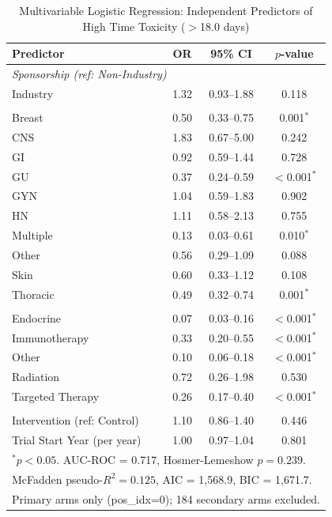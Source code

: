 \documentclass[11pt,a4paper]{article}
\begin{document}
\begin{table}[H]
\centering
\caption{Multivariable Logistic Regression: Independent Predictors of High Time Toxicity ($>$18.0 days)}
\label{tab:regression}
\begin{tabular}{lccc}
\toprule
\textbf{Predictor} & \textbf{OR} & \textbf{95\% CI} & \textbf{$p$-value} \\
\midrule
\multicolumn{4}{l}{\textit{Sponsorship (ref: Non-Industry)}} \\
\quad Industry & 1.32 & 0.93--1.88 & 0.118 \\
\addlinespace
\multicolumn{4}{l}{\textit{Disease Site (ref: Hematologic)}} \\
\quad Breast & 0.50 & 0.33--0.75 & 0.001$^*$ \\
\quad CNS & 1.83 & 0.67--5.00 & 0.242 \\
\quad GI & 0.92 & 0.59--1.44 & 0.728 \\
\quad GU & 0.37 & 0.24--0.59 & $<$0.001$^*$ \\
\quad GYN & 1.04 & 0.59--1.83 & 0.902 \\
\quad HN & 1.11 & 0.58--2.13 & 0.755 \\
\quad Multiple & 0.13 & 0.03--0.61 & 0.010$^*$ \\
\quad Other & 0.56 & 0.29--1.09 & 0.088 \\
\quad Skin & 0.60 & 0.33--1.12 & 0.108 \\
\quad Thoracic & 0.49 & 0.32--0.74 & 0.001$^*$ \\
\addlinespace
\multicolumn{4}{l}{\textit{Treatment Modality (ref: Chemotherapy)}} \\
\quad Endocrine & 0.07 & 0.03--0.16 & $<$0.001$^*$ \\
\quad Immunotherapy & 0.33 & 0.20--0.55 & $<$0.001$^*$ \\
\quad Other & 0.10 & 0.06--0.18 & $<$0.001$^*$ \\
\quad Radiation & 0.72 & 0.26--1.98 & 0.530 \\
\quad Targeted Therapy & 0.26 & 0.17--0.40 & $<$0.001$^*$ \\
\addlinespace
\multicolumn{4}{l}{\textit{Other}} \\
\quad Intervention (ref: Control) & 1.10 & 0.86--1.40 & 0.446 \\
\quad Trial Start Year (per year) & 1.00 & 0.97--1.04 & 0.801 \\
\bottomrule
\multicolumn{4}{l}{\footnotesize $^*p<0.05$. AUC-ROC = 0.717, Hosmer-Lemeshow $p=0.239$.} \\
\multicolumn{4}{l}{\footnotesize McFadden pseudo-$R^2 = 0.125$, AIC = 1{,}568.9, BIC = 1{,}671.7.} \\
\multicolumn{4}{l}{\footnotesize Primary arms only (pos\_idx=0); 184 secondary arms excluded.} \\
\end{tabular}
\end{table}
\end{document}
